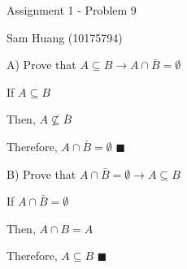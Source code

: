 \documentclass{report}
\begin{document}
    Assignment 1 - Problem 9
    
    Sam Huang (10175794)
    \bigskip
    
    A) Prove that $A \subseteq B \rightarrow A \cap \bar{B} = \emptyset$
    
    If $A \subseteq B$
    
    Then, $A \not\subseteq \bar{B}$
    
    Therefore, $A \cap \bar{B} = \emptyset$
    $\blacksquare$
    
    \medskip
    
    B) Prove that $A \cap \bar{B} = \emptyset \rightarrow A \subseteq B$
    
    If $A \cap \bar{B} = \emptyset$
    
    Then, $A \cap B = A$
    
    Therefore, $A \subseteq B$
    $\blacksquare$
    
    
\end{document}
